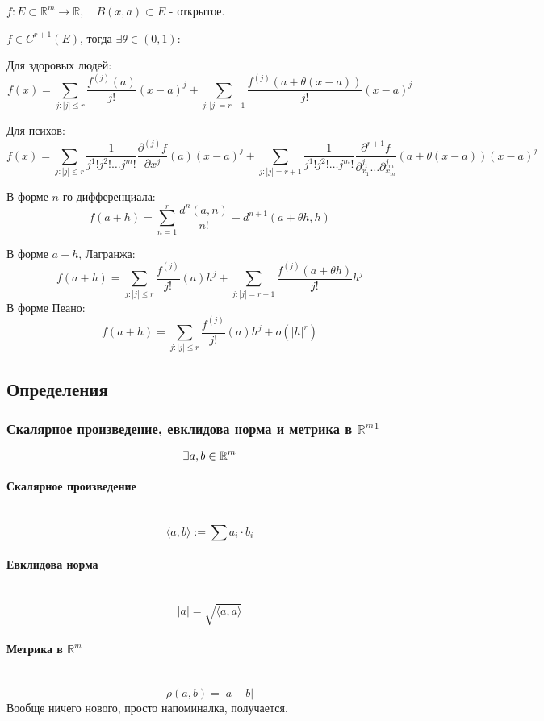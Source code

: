 \documentclass{article}
\def\letus{%
\mathord{\setbox0=\hbox{$\exists$}%
         \hbox{\kern 0.125\wd0%
               \vbox to \ht0{%
                  \hrule width 0.75\wd0%
                  \vfill%
                  \hrule width 0.75\wd0}%
               \vrule height \ht0%
               \kern 0.125\wd0}%
       }%
        }
\let\vanillaparagraph\paragraph
\renewcommand{\paragraph}[1]{\vanillaparagraph{#1}\mbox{}\\}
\begin{document}
$f: E \subset \mathbb R^m \to \mathbb R,\quad B(x,a) \subset E$ - открытое.

$f \in C^{r + 1}(E)$, тогда $\exists \theta \in (0,1):$

Для здоровых людей:
$$
f(x) = \sum_{j: |j| \leq r} \frac{f^{(j)}(a)}{j!}(x-a)^j + \sum_{j: |j| = r + 1} \frac{f^{(j)} (a + \theta(x-a))}{j!} (x-a)^j
$$

Для психов:
$$
f(x) = \sum_{j:|j| \leq r} \frac{1}{j^1!j^2!\dots j^m!} \frac {\partial^{(j)}f}{\partial x^j}(a) (x-a)^j + \sum_{j:|j|= r + 1} \frac{1} {j^1!j^2!\dots j^m!} \frac{\partial^{r + 1} f} {\partial_{x_1}^{j_1}\dots \partial_{x_m}^{j_m}} (a + \theta(x-a)) (x-a)^j
$$

В форме $n$-го дифференциала:
$$
f(a + h) = \sum_{n=1}^r \frac{d^n(a, n)}{n!} + d^{n+1}(a + \theta h, h)
$$

В форме $a + h$, Лагранжа:
$$
f(a + h) = \sum_{j:|j| \leq r} \frac{f^{(j)}}{j!}(a)h^j + \sum_{j: |j| = r + 1} \frac{f^{(j)}(a + \theta h)} {j!} h^j
$$
В форме Пеано:
$$
f(a + h) = \sum_{j:|j| \leq r} \frac{f^{(j)}}{j!}(a)h^j + o(|h|^r)
$$

\newpage
\subsection{Определения}

\subsubsection{Скалярное произведение, евклидова норма и метрика в \texorpdfstring{$\mathbb{R}^m$}{R\^m}\texorpdfstring{$^1$}{}}
$$
\letus a, b \in \mathbb{R}^m
$$
\paragraph{Скалярное произведение}
$$
\langle a, b \rangle := \sum a_i \cdot b_i
$$

\paragraph{Евклидова норма}
$$
|a| = \sqrt{\langle a, a\rangle}
$$

\paragraph{Метрика в \texorpdfstring{$\mathbb{R}^m$}{R\^m}}
$$
\rho(a, b) = |a - b|
$$
Вообще ничего нового, просто напоминалка, получается. 
\end{document}
